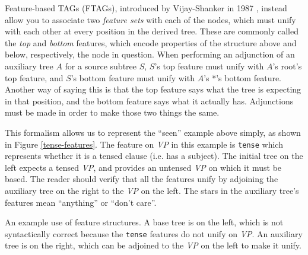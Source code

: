 \documentclass[12pt]{article}
\newcommand{\defn}[1]{\textit{#1}}
\begin{document}
Feature-based TAGs (FTAGs), introduced by Vijay-Shanker in 1987
\cite{Vijay-Shanker-1987}, instead allow you to associate two
\defn{feature sets} with each of the nodes, which must unify with each
other at every position in the derived tree.  These are commonly called
the \defn{top} and \defn{bottom} features, which encode properties of
the structure above and below, respectively, the node in question.  When
performing an adjunction of an auxiliary tree $A$ for a source subtree
$S$, $S$'s top feature must unify with $A$'s root's top feature, and
$S$'s bottom feature must unify with $A$'s *'s bottom feature.  Another
way of saying this is that the top feature says what the tree is
expecting in that position, and the bottom feature says what it actually
has.  Adjunctions must be made in order to make those two things the
same.

This formalism allows us to represent the ``seen'' example above simply,
as shown in Figure \ref{tense-features}.  The feature on \textit{VP} in
this example is \texttt{tense} which represents whether it is a tensed
clause (i.e. has a subject).  The initial tree on the left expects a
tensed \textit{VP}, and provides an untensed \textit{VP} on which it
must be based.  The reader should verify that all the features unify by
adjoining the auxiliary tree on the right to the \textit{VP} on the
left.  The stars in the auxiliary tree's features mean ``anything'' or
``don't care''.

\begin{Figure}
\begin{center}
\end{center}
\caption{An example use of feature structures.  A base tree is on the
left, which is not syntactically correct because the \texttt{tense}
features do not unify on \textit{VP}.  An auxiliary tree is on the
right, which can be adjoined to the \textit{VP} on the left to make
it unify.}
\label{tense-features}
\end{Figure}

\clearpage
\end{document}
